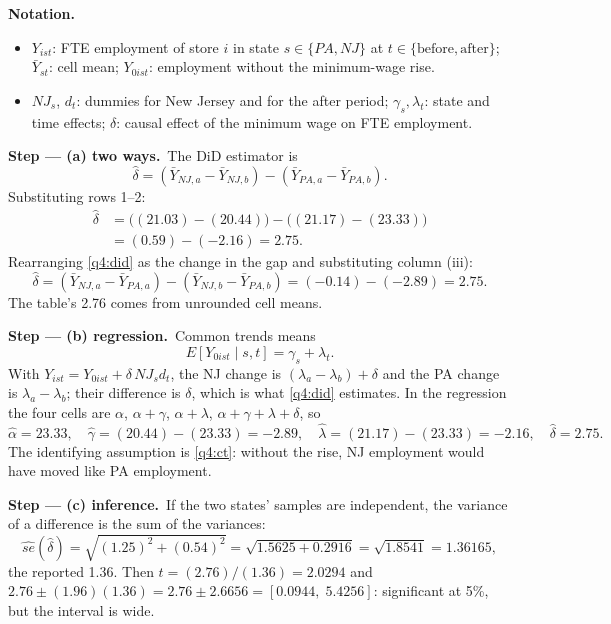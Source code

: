 \documentclass[11pt,a4paper]{article}
\newenvironment{notacao}{\par\smallskip\noindent\textbf{Notation.}\begin{itemize}[leftmargin=1.4em,topsep=1pt,itemsep=0pt]\small}{\end{itemize}}
\newcommand{\passo}[2]{\par\smallskip\noindent\textbf{Step --- #1.}~#2}
\begin{document}
\begin{sol}
\begin{notacao}
\item $Y_{ist}$: FTE employment of store $i$ in state $s\in\{PA,NJ\}$ at $t\in\{\text{before},\text{after}\}$;
$\bar Y_{st}$: cell mean; $Y_{0ist}$: employment without the minimum-wage rise.
\item $NJ_s$, $d_t$: dummies for New Jersey and for the after period; $\gamma_s,\lambda_t$: state and time
effects; $\delta$: causal effect of the minimum wage on FTE employment.
\end{notacao}

\passo{(a) two ways}{The DiD estimator is
\begin{equation}
\hat\delta=(\bar Y_{NJ,a}-\bar Y_{NJ,b})-(\bar Y_{PA,a}-\bar Y_{PA,b}).\label{q4:did}
\end{equation}
Substituting rows 1--2:
\begin{align}
\hat\delta&=\big((21.03)-(20.44)\big)-\big((21.17)-(23.33)\big)\label{q4:sub1}\\
&=(0.59)-(-2.16)=2.75.\label{q4:res1}
\end{align}
Rearranging \eqref{q4:did} as the change in the gap and substituting column (iii):
\begin{equation}
\hat\delta=(\bar Y_{NJ,a}-\bar Y_{PA,a})-(\bar Y_{NJ,b}-\bar Y_{PA,b})=(-0.14)-(-2.89)=2.75.\label{q4:res2}
\end{equation}
The table's 2.76 comes from unrounded cell means.}

\passo{(b) regression}{Common trends means
\begin{equation}
E[Y_{0ist}\mid s,t]=\gamma_s+\lambda_t.\label{q4:ct}
\end{equation}
With $Y_{ist}=Y_{0ist}+\delta\,NJ_s d_t$, the NJ change is $(\lambda_a-\lambda_b)+\delta$ and the PA change
is $\lambda_a-\lambda_b$; their difference is $\delta$, which is what \eqref{q4:did} estimates. In the
regression the four cells are $\alpha$, $\alpha+\gamma$, $\alpha+\lambda$, $\alpha+\gamma+\lambda+\delta$, so
\begin{equation}
\hat\alpha=23.33,\quad\hat\gamma=(20.44)-(23.33)=-2.89,\quad\hat\lambda=(21.17)-(23.33)=-2.16,\quad\hat\delta=2.75.\label{q4:coefs}
\end{equation}
The identifying assumption is \eqref{q4:ct}: without the rise, NJ employment would have moved like PA employment.}

\passo{(c) inference}{If the two states' samples are independent, the variance of a difference is the sum of the variances:
\begin{equation}
\widehat{se}(\hat\delta)=\sqrt{(1.25)^2+(0.54)^2}=\sqrt{1.5625+0.2916}=\sqrt{1.8541}=1.36165,\label{q4:se}
\end{equation}
the reported 1.36. Then $t=(2.76)/(1.36)=2.0294$ and $2.76\pm(1.96)(1.36)=2.76\pm2.6656=[0.0944,\;5.4256]$:
significant at 5\%, but the interval is wide.}


\end{sol}
\end{document}
